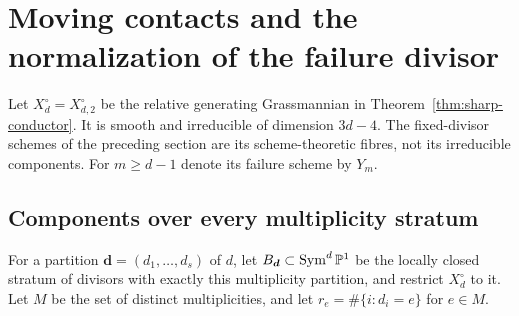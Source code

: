 \section{Moving contacts and the normalization of the failure divisor}
\label{sec:moving-contact-normalization}
Let $X_d^\circ=X_{d,2}^\circ$ be the relative generating Grassmannian
in Theorem~\ref{thm:sharp-conductor}. It is smooth and irreducible
of dimension $3d-4$. The fixed-divisor schemes of the preceding
section are its scheme-theoretic fibres, not its irreducible
components. For $m\ge d-1$ denote its failure scheme by $Y_m$.

\subsection{Components over every multiplicity stratum}
For a partition $\boldsymbol d=(d_1,\ldots,d_s)$ of $d$, let
$B_{\boldsymbol d}\subset\operatorname{Sym}^d\mathbb P^1$ be the locally
closed stratum of divisors with exactly this multiplicity partition,
and restrict $X_d^\circ$ to it. Let $M$ be the set of distinct
multiplicities, and let $r_e=\#\{i:d_i=e\}$ for $e\in M$.

